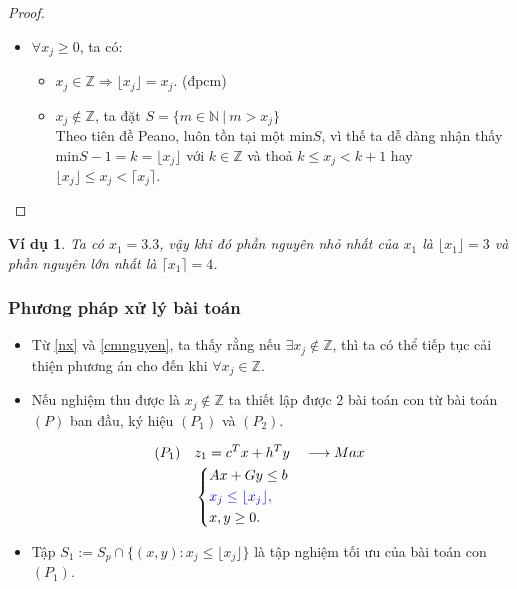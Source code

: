 \documentclass[12pt,a4paper]{report}
\newtheorem{vd}{Ví dụ}
\begin{document}
\begin{proof}
\phantom{}
\begin{itemize}
\item $\forall x_j \geq 0$, ta có:
\begin{itemize}
\item $x_j \in \mathbb{Z} \Rightarrow \lfloor x_j \rfloor =x_j$. (đpcm)
\item $x_j \notin \mathbb{Z}$, ta đặt $S=\{ m \in \mathbb{N} \: \vert \: m > x_j \}$ \\ Theo tiên đề Peano, luôn tồn tại một min$S$, vì thế ta dễ dàng nhận thấy min$S -1=k=\lfloor x_j \rfloor$ với $k \in \mathbb{Z}$ và thoả $k \leq x_j < k+1$ hay $\lfloor x_j \rfloor \leq x_j <\lceil x_j \rceil$. 
\end{itemize}
\end{itemize}
\end{proof}

\begin{vd}
Ta có $x_1=3.3$, vậy khi đó phần nguyên nhỏ nhất của $x_1$ là $\lfloor x_1 \rfloor = 3$ và phần nguyên lớn nhất là $\lceil x_1 \rceil =4$.
\end{vd}


\subsubsection*{Phương pháp xử lý bài toán}

\begin{itemize}
\item Từ \eqref{nx} và \eqref{cmnguyen}, ta thấy rằng nếu $\exists x_j \notin \mathbb{Z}$, thì ta có thể tiếp tục cải thiện phương án cho đến khi $\forall x_j \in \mathbb{Z}$. 
\item Nếu nghiệm thu được là $x_j \notin \mathbb{Z}$ ta thiết lập được 2 bài toán con từ bài toán $(P)$ ban đầu, ký hiệu $(P_1)$ và $(P_2)$.
\end{itemize}



\begin{equation}
    \begin{split}
    (P_1) \quad & z_1=c^Tx+h^Ty \quad \longrightarrow Max \\
                & \left\{\begin{split}
                    &Ax+Gy \leq  b \\
                    &\color{blue} x_j \leq \lfloor x_j \rfloor , \\
                    &x,y \geq 0.
                \end{split}\right.    
    \end{split}
\end{equation}
\begin{itemize}
\item Tập $S_1:=S_p \cap \{ (x,y): x_j \leq \lfloor x_j \rfloor \}$ là tập nghiệm tối ưu của bài toán con $(P_1)$.
\end{itemize}
\end{document}
